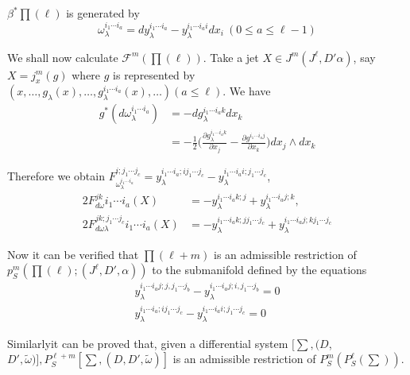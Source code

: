 $\beta^* \prod (\ell)$ is generated by
$$
\omega^{i_1 \cdots i_a}_{\lambda} = dy^{i_1 \cdots i_a}_{\lambda} -
y^{i_1 \cdots i_a i}_{\lambda} dx_i ~(0 \leq a \leq \ell - 1) 
$$

We shall now calculate $\mathscr{F}^m (\prod (\ell))$. Take a jet $X
\in J^m (J^\ell , D' \alpha)$, say $X = j^m_x (g)$ where $g$ is
represented by $(x, \ldots , g_{\lambda}(x), \ldots , g^{i_1 \cdots
  i_a}_{\lambda} (x), \ldots )(a \leq \ell)$. We have 
\begin{align*}
  g^* (d \omega^{i_1 \cdots i_a}_{\lambda}) & = - dg^{i_1 \cdots i_a k}_{\lambda} dx_k \\
  & = - \frac{1}{2} \bigg( \frac{\partial g^{i_1 \cdots i_a
      k}_{\lambda}}{\partial x_j} - \frac{\partial g^{i_1 \cdots i_a
      j}}{\partial x_k} \bigg) dx_j \wedge dx_k 
\end{align*}

Therefore we obtain $F_{\omega_\lambda^{i_1 \cdots i_a}}^{i; 
  j_1 \cdots j_c} = y^{i_1 \cdots i_a ; ij_1 \cdots j_c}_{\lambda} -
y^{i_1 \cdots i_a  i;  j_1 \cdots j_c}_{\lambda}$, 
\begin{align*}
  2 F^{jk}_{d \omega} i_1 \cdots i_a (X) & = - y^{i_1 \cdots i_a k;j
  }_{\lambda} + y^{i_1 \cdots i_a j;k }_{\lambda}, \\ 
  2 F^{jk; j_1 \cdots j_c}_{d \omega \lambda} i_1 \cdots i_a (X) & = -
  y^{i_1 \cdots i_a k;j  j_1 \cdots j_c}_{\lambda} + y^{i_1 \cdots i_a
    j;k j_1 \cdots j_c }_{\lambda} 
\end{align*}

Now it can be verified that $\prod (\ell + m)$ is an admissible
restriction of $p^m_S (\prod (\ell); (J^\ell , D', \alpha))$ to the
submanifold defined by the equations  
\begin{gather*}
  y^{i_1 \cdots i_a j;j, j_1 \cdots j_b }_{\lambda} - y^{i_1 \cdots i_a
    j;i, j_1 \cdots j_b}_{\lambda} = 0\\ 
  y^{i_1 \cdots i_a ;i j_1 \cdots j_c }_{\lambda} - y^{i_1 \cdots i_a
    i; j_1 \cdots j_c }_{\lambda} = 0 
\end{gather*}

Similarly\pageoriginale it can be proved that, given a differential system $[\sum ,
  (D$, $D', \tilde{\omega})] ,P^{\ell +m}_S [\sum , (D, D',
  \tilde{\omega})]$ is an admissible restriction of $P^m_S(P^\ell_S
(\sum))$. 

\section{}\label{chap3:sec3.5} %

